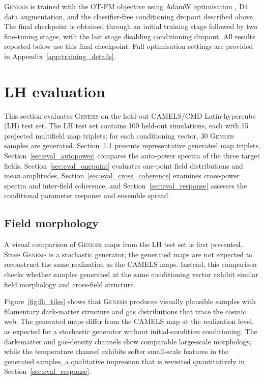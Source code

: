 \documentclass[usenatbib]{mnras}
\begin{document}
\textsc{Genesis} is trained with the OT-FM objective using AdamW
optimisation \citep{Loshchilov2019}, D4 data augmentation, and the
classifier-free conditioning dropout described above. The final
checkpoint is obtained through an initial training stage followed by
two fine-tuning stages, with the last stage disabling conditioning
dropout. All results reported below use this final checkpoint. Full
optimisation settings are provided in Appendix~\ref{app:training_details}.

\section{LH evaluation}
\label{sec:eval}

This section evaluates \textsc{Genesis} on the held-out CAMELS/CMD
Latin-hypercube (LH) test set. The LH test set contains 100 held-out
simulations, each with 15 projected multifield map triplets; for each
conditioning vector, 30 \textsc{Genesis} samples are generated.
Section~\ref{sec:eval_morphology} presents representative generated
map triplets, Section~\ref{sec:eval_autopower} compares the
auto-power spectra of the three target fields,
Section~\ref{sec:eval_onepoint} evaluates one-point field
distributions and mean amplitudes,
Section~\ref{sec:eval_cross_coherence} examines cross-power spectra
and inter-field coherence, and Section~\ref{sec:eval_response}
assesses the conditional parameter response and ensemble spread.

\subsection{Field morphology}
\label{sec:eval_morphology}

A visual comparison of \textsc{Genesis} maps from the
LH test set is first presented. Since \textsc{Genesis} is a stochastic generator, the
generated maps are not expected to reconstruct the same realization
as the CAMELS maps. Instead, this comparison checks whether samples
generated at the same conditioning vector exhibit similar field
morphology and cross-field structure.

Figure~\ref{fig:lh_tiles} shows that \textsc{Genesis} produces
visually plausible samples with filamentary dark-matter structure and
gas distributions that trace the cosmic web. The generated maps
differ from the CAMELS map at the realization level, as expected for
a stochastic generator without initial-condition conditioning. The
dark-matter and gas-density channels show comparable large-scale
morphology, while the temperature channel exhibits softer small-scale
features in the generated samples, a qualitative impression that is
revisited quantitatively in Section~\ref{sec:eval_response}.
\end{document}
